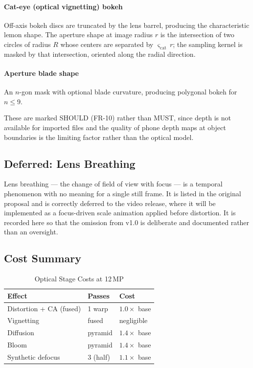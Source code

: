 \paragraph{Cat-eye (optical vignetting) bokeh} Off-axis bokeh discs are
truncated by the lens barrel, producing the characteristic lemon shape. The
aperture shape at image radius $r$ is the intersection of two circles of radius
$R$ whose centers are separated by $\varsigma_{\mathrm{cat}}\, r$; the sampling
kernel is masked by that intersection, oriented along the radial direction.

\paragraph{Aperture blade shape} An $n$-gon mask with optional blade curvature,
producing polygonal bokeh for $n \le 9$.

These are marked SHOULD (FR-10) rather than MUST, since depth is not available
for imported files and the quality of phone depth maps at object boundaries is
the limiting factor rather than the optical model.

\subsection{Deferred: Lens Breathing}

Lens breathing --- the change of field of view with focus --- is a temporal
phenomenon with no meaning for a single still frame. It is listed in the
original proposal and is correctly deferred to the video release, where it will
be implemented as a focus-driven scale animation applied before distortion. It
is recorded here so that the omission from v1.0 is deliberate and documented
rather than an oversight.

\subsection{Cost Summary}

\begin{table}[htbp]
\caption{Optical Stage Costs at 12\,MP}
\label{tab:opticalcost}
\begin{center}
\renewcommand{\arraystretch}{1.15}
\begin{tabular}{@{}lll@{}}
\toprule
\textbf{Effect} & \textbf{Passes} & \textbf{Cost} \\
\midrule
Distortion + CA (fused)  & 1 warp    & $1.0\times$ base \\
Vignetting               & fused     & negligible \\
Diffusion                & pyramid   & $1.4\times$ base \\
Bloom                    & pyramid   & $1.4\times$ base \\
Synthetic defocus        & 3 (half)  & $1.1\times$ base \\
\bottomrule
\end{tabular}
\end{center}
\end{table}

